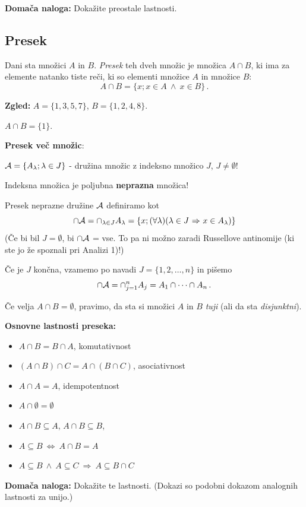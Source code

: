 \documentclass[12pt,a4paper]{article}
\def\inn {{~\wedge~}}
\def\sledi {{~\Rightarrow~}}
\def\cee {{~\Leftrightarrow~}}
\begin{document}
\bigskip
{\bf Domača naloga:} Dokažite preostale lastnosti.
\bigskip

\subsection*{Presek}
Dani sta množici $A$ in $B$. {\em Presek} teh dveh množic je množica $A\cap B$, ki ima za elemente natanko tiste reči, ki so elementi množice $A$ in množice $B$:
$$A\cap B = \{x; x\in A \inn x\in B\}\,.$$

{\bf Zgled:}
$A = \{1,3,5,7\}$, $B = \{1,2,4,8\}$.

$A\cap B = \{1\}$.

\medskip

{\bf Presek več množic}:

${\cal A} = \{A_\lambda; \lambda \in J\}$ - družina množic z indeksno množico $J$, $J\neq \emptyset$!

Indeksna množica je poljubna {\bf neprazna} množica!

Presek neprazne družine ${\cal A}$ definiramo kot
$$\cap {\cal A} = \cap_{\lambda \in J} A_\lambda = \{x;(\forall\lambda) (\lambda \in J\sledi x\in A_\lambda)\}$$
(Če bi bil $J = \emptyset$, bi $\cap {\cal A}$ = vse. To pa ni možno zaradi Russellove antinomije (ki ste jo že spoznali pri Analizi 1)!)

\medskip
Če je $J$ končna, vzamemo po navadi $J = \{1,2,\ldots, n\}$ in pišemo
$$\cap {\cal A} = \cap_{j = 1}^nA_j = A_1\cap\cdots\cap A_n\,.$$

Če velja
$A\cap B = \emptyset$, pravimo, da sta si množici $A$ in $B$ {\em tuji}
(ali da sta {\em disjunktni}).

\bigskip
{\bf Osnovne lastnosti preseka:}
\begin{itemize}
  \item $A\cap B = B\cap A$, komutativnost
  \item $(A\cap B)\cap C = A\cap (B\cap C)$, asociativnost
  \item $A\cap A = A$, idempotentnost
  \item $A\cap \emptyset = \emptyset$
  \item $A\cap B\subseteq A$, $A\cap B\subseteq B$,
  \item $A\subseteq B\cee A\cap B = A$
  \item $A\subseteq B\inn A\subseteq C\sledi A \subseteq B\cap C$
\end{itemize}

\bigskip
{\bf Domača naloga:} Dokažite te lastnosti. (Dokazi so podobni dokazom analognih lastnosti za unijo.)
\end{document}
